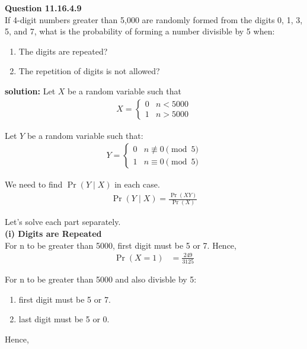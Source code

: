 \documentclass{article}
\begin{document}
\providecommand{\pr}[1]{\ensuremath{\Pr\left(#1\right)}}
\providecommand{\brak}[1]{\ensuremath{\left(#1\right)}}
\newcommand{\solution}{\noindent \textbf{solution: }}

\textbf{Question 11.16.4.9}\\
If 4-digit numbers greater than 5,000 are randomly formed from the digits 0, 1, 3, 5, and 7, what is the probability of forming a number divisible by 5 when:
\begin{enumerate}
    \item The digits are repeated?
    \item The repetition of digits is not allowed?
\end{enumerate}

\solution
Let $X$ be a random variable such that 
\begin{align}
	X = \begin{cases}
		0 &  n<5000\\
		1 &  n>5000\end{cases}
\end{align}

Let $Y$ be a random variable such that:
\begin{align}
	Y = \begin{cases}
		0 & n \not\equiv 0 \pmod{5}\\
		1 & n \equiv 0 \pmod{5}\end{cases}
\end{align}

We need to find \pr{Y \mid X} in each case. \\

\begin{align}
	\pr{Y \mid X}=\frac{\pr{XY} }{\pr{X}}
\end{align}

Let's solve each part separately. \\

\textbf{(i) Digits are Repeated}\\
For n to be greater than 5000, first digit must be 5 or 7. Hence,
\begin{align}
	\pr{X=1} &=\frac{249}{3125}
\end{align}

For n to be greater than 5000 and also divisble by 5:
\begin{enumerate}
\item first digit must be 5 or 7.
\item last digit must be 5 or 0.
\end{enumerate}
Hence,
\end{document}
